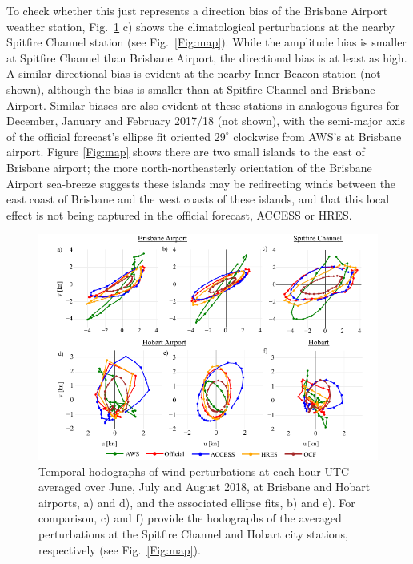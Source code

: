 \documentclass[twocol]{ametsoc}
\begin{document}
To check whether this just represents a direction bias of the Brisbane Airport weather station, Fig.~\ref{Fig:ellipse_hodo} c) shows the climatological perturbations at the nearby Spitfire Channel station (see Fig.~\ref{Fig:map}). While the amplitude bias is smaller at Spitfire Channel than Brisbane Airport, the directional bias is at least as high. A similar directional bias is evident at the nearby Inner Beacon station (not shown), although the bias is smaller than at Spitfire Channel and Brisbane Airport. Similar biases are also evident at these stations in analogous figures for December, January and February 2017/18 (not shown), with the semi-major axis of the official forecast's ellipse fit oriented $29^\circ$ clockwise from AWS's at Brisbane airport. Figure \ref{Fig:map} shows there are two small islands to the east of Brisbane airport; the more north-northeasterly orientation of the Brisbane Airport sea-breeze suggests these islands may be redirecting winds between the east coast of Brisbane and the west coasts of these islands, and that this local effect is not being captured in the official forecast, ACCESS or HRES. 

\begin{figure}
\centering
\includegraphics[width=33pc]{ellipse_hodo.pdf}
\caption{Temporal hodographs of wind perturbations at each hour UTC averaged over June, July and August 2018, at Brisbane and Hobart airports, a) and d), and the associated ellipse fits, b) and e). For comparison, c) and f) provide the hodographs of the averaged perturbations at the Spitfire Channel and Hobart city stations, respectively (see Fig.~\ref{Fig:map}).}
\label{Fig:ellipse_hodo}
\end{figure}
\end{document}
